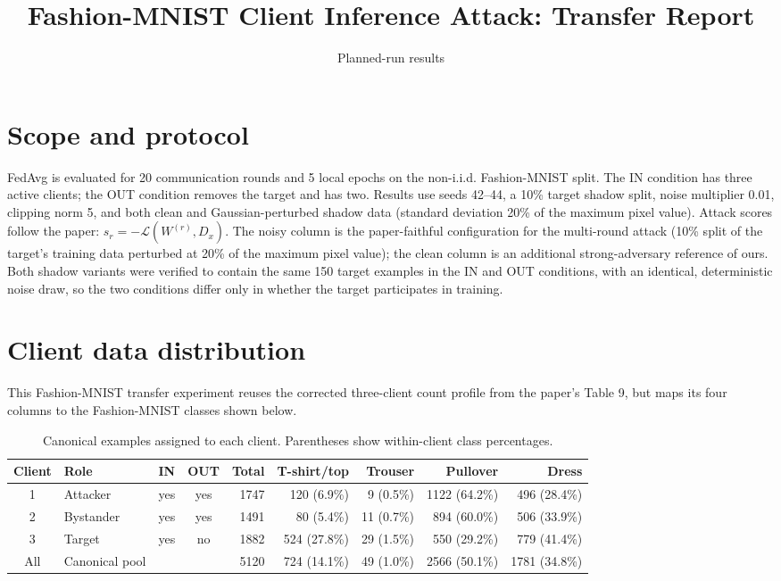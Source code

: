\documentclass[10pt]{article}
\title{Fashion-MNIST Client Inference Attack: Transfer Report}
\author{Planned-run results}
\date{}
\begin{document}
\maketitle
\thispagestyle{empty}

\section*{Scope and protocol}
FedAvg is evaluated for 20 communication rounds and 5 local epochs on the non-i.i.d. Fashion-MNIST split.
The IN condition has three active clients; the OUT condition removes the target and has two.
Results use seeds 42--44, a 10\% target shadow split, noise multiplier 0.01, clipping norm 5,
and both clean and Gaussian-perturbed shadow data (standard deviation 20\% of the maximum pixel value).
Attack scores follow the paper: $s_r=-\mathcal{L}(W^{(r)},D_x)$.
The noisy column is the paper-faithful configuration for the multi-round attack (10\% split of the
target's training data perturbed at 20\% of the maximum pixel value); the clean column is an
additional strong-adversary reference of ours. Both shadow variants were verified to contain the same
150 target examples in the IN and OUT conditions, with an identical, deterministic noise draw, so the
two conditions differ only in whether the target participates in training.

\section*{Client data distribution}
This Fashion-MNIST transfer experiment reuses the corrected three-client count profile from the paper's Table 9, but maps its four columns to the Fashion-MNIST classes shown below.

\begin{table}[h]
\centering
\caption{Canonical examples assigned to each client. Parentheses show within-client class percentages.}
\begin{tabular}{clccrrrrr}
\toprule
Client & Role & IN & OUT & Total & T-shirt/top & Trouser & Pullover & Dress \\
\midrule
1 & Attacker & yes & yes & 1747 & 120 (6.9\%) & 9 (0.5\%) & 1122 (64.2\%) & 496 (28.4\%) \\
2 & Bystander & yes & yes & 1491 & 80 (5.4\%) & 11 (0.7\%) & 894 (60.0\%) & 506 (33.9\%) \\
3 & Target & yes & no & 1882 & 524 (27.8\%) & 29 (1.5\%) & 550 (29.2\%) & 779 (41.4\%) \\
\midrule
All & Canonical pool & & & 5120 & 724 (14.1\%) & 49 (1.0\%) & 2566 (50.1\%) & 1781 (34.8\%) \\
\bottomrule
\end{tabular}
\end{table}
\end{document}
